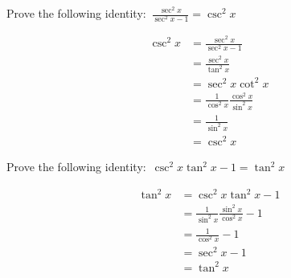 \documentclass[addpoints]{exam}
\begin{document}
  \vspace{1in}

  \noindent{}

  \vspace{.1in}

  \begin{center}
  \end{center}

  \begin{questions}
    \question Prove the following identity: $\displaystyle\, \frac{\sec^2 x}{\sec^2 x - 1} = \csc^2 x$ 
    \begin{solution}[\stretch{1}]
      \begin{align*}
         \csc^2 x &= \frac{\sec^2 x}{\sec^2 x - 1} \\ 
         &= \frac{\sec^2 x}{\tan^2 x} \\ 
         &= \sec^2 x \cot^2 x \\ 
         &= \frac{1}{\cos^2 x} \frac{\cos^2 x}{\sin^2 x} \\ 
         &= \frac{1}{\sin^2 x} \\ 
         &= \csc^2 x
      \end{align*}
    \end{solution}

    \question Prove the following identity: $\displaystyle\, \csc^2 x \tan^2 x - 1 = \tan^2 x$
    \begin{solution}[\stretch{1}]
      \begin{align*}
        \tan^2 x &= \csc^2 x \tan^2 x - 1 \\ 
        &= \frac{1}{\sin^2 x}\frac{\sin^2 x}{\cos^2 x} - 1 \\ 
        &= \frac{1}{\cos^2 x} - 1 \\ 
        &= \sec^2 x - 1 \\ 
        &= \tan^2 x
      \end{align*}
    \end{solution}

    \newpage


\end{questions}
\end{document}
